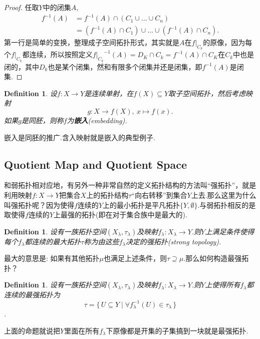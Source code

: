 \documentclass{article}
\newtheorem{definition}[theorem]{Definition}
\newcommand*{\xfunc}[4]{{#2}\colon{#3}{#1}{#4}}
\newcommand*{\func}[3]{\xfunc{\to}{#1}{#2}{#3}}
\newcommand\Set[2]{\{\,#1\mid#2\,\}} %
\begin{document}
\begin{proof}
任取$Y$中的闭集$A$,\[\begin{aligned} 
					f^{-1}(A)&=f^{-1}(A) \cap (C_1 \cup \ldots \cup C_n)\\
					&=(f^{-1}(A) \cap C_1) \cup \ldots \cup (f^{-1}(A) \cap C_n).\end{aligned}\]第一行是简单的变换，整理成子空间拓扑形式，其实就是$A$在$f|_{C_k}$的原像，因为每个$f|_{C_k}$都连续，所以按照定义${f|_{C_k}}^{-1}(A)=D_K \cap C_k = f^{-1}({A}) \cap C_K $在$C_k$中也是闭的，其中$D_k$也是某个闭集，然和有限多个闭集并还是闭集，即$f^{-1}(A)$是闭集.
\end{proof}

\begin{definition}
设$\func{f}{X}{Y}$是连续单射，在$f(X) \subseteq Y$取子空间拓扑，然后考虑映射\[\func{g}{X}{f(X)},\ x \mapsto f(x).\]如果$g$是同胚，则称$f$为\textbf{嵌入}(embedding).
\end{definition}

嵌入是同胚的推广.含入映射就是嵌入的典型例子.


\newpage
\subsection{Quotient Map and Quotient Space}
和弱拓扑相对应地，有另外一种非常自然的定义拓扑结构的方法叫“强拓扑”，就是利用映射$\func{f}{X}{Y}$把集合$X$上的拓扑结构$\tau$“向右转移”到集合$Y$上去.那么这里为什么叫强拓扑呢？因为使得$f$连续的$Y$上的最小拓扑是平凡拓扑$\{Y,\emptyset\}$.与弱拓扑相反的是取使得$f$连续的$Y$上最强的拓扑(即在对于集合族中是最大的).


\begin{definition}
设有一族拓扑空间$(X_\lambda,\tau_\lambda)$及映射$\func{f_\lambda}{X_\lambda}{Y}$.则$Y$上满足条件使得每个$f_\lambda$都连续的最大拓扑$\tau$称为由这些$f_\lambda$决定的强拓扑(strong topology).
\end{definition}

最大的意思是: 如果有其他拓扑$\mu$也满足上述条件，则$\tau \supseteq \mu$.那么如何构造最强拓扑？

\begin{definition}
设有一族拓扑空间$(X_\lambda,\tau_\lambda)$及映射$\func{f_\lambda}{X_\lambda}{Y}$.则$Y$上使得所有$f_\lambda$都连续的最强拓扑为\[\tau = \Set{U \subseteq Y}{\forall f_\lambda^{-1}(U) \in \tau_\lambda}\].
\end{definition}

上面的命题就说把$Y$里面在所有$f_\lambda$下原像都是开集的子集搞到一块就是最强拓扑.
\end{document}
